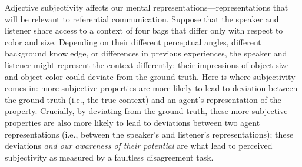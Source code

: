 \documentclass[12pt]{article}
\begin{document}
Adjective subjectivity affects our mental representations---representations that will be relevant to referential communication. Suppose that the speaker and listener share access to a context of four bags that differ only with respect to color and size. Depending on their different perceptual angles, different background knowledge, or differences in previous experiences, the speaker and listener might represent the context differently: their impressions of object size and object color could deviate from the ground truth. 
Here is where subjectivity comes in: more subjective properties are more likely to lead to deviation between the ground truth (i.e., the true context) and an agent's representation of the property. Crucially, by deviating from the ground truth, these more subjective properties are also more likely to lead to deviations between two agent representations (i.e., between the speaker's and listener's representations); these deviations \emph{and our awareness of their potential} are what lead to perceived subjectivity as measured by a faultless disagreement task. 
\end{document}
